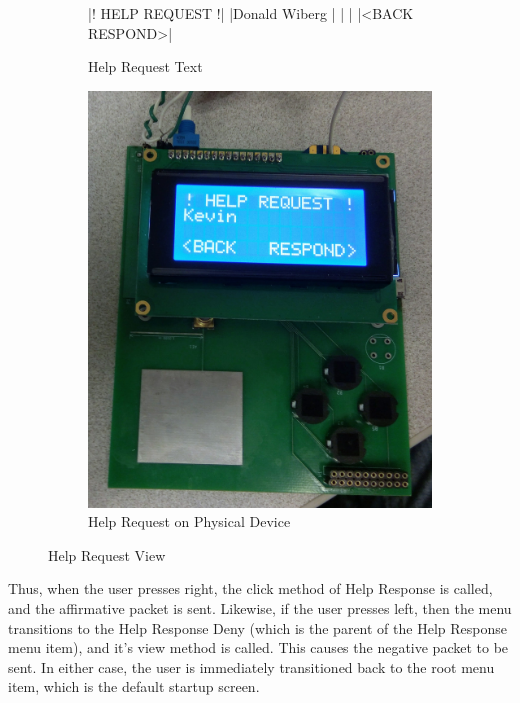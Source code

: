\documentclass[journal,compsoc]{IEEEtran}
\begin{document}
\begin{figure}
  \begin{subfigure}{0.48\textwidth}
  \centering
   |! HELP REQUEST !|
              |Donald Wiberg   |
              |                |
              |<BACK   RESPOND>|
  \caption{Help Request Text}
  \end{subfigure}
  \begin{subfigure}{0.48\textwidth}
  	\centering
  	\includegraphics[width=\textwidth]{device_help_request.jpg}
    \caption{Help Request on Physical Device}
  \end{subfigure}
  \caption{Help Request View}
  \label{menu view help}
\end{figure}

Thus, when the user presses right, the click method of Help Response is called, and the affirmative packet is sent. Likewise, if the user presses left, then the menu transitions to the Help Response Deny (which is the parent of the Help Response menu item), and it's view method is called. This causes the negative packet to be sent. In either case, the user is immediately transitioned back to the root menu item, which is the default startup screen.
\end{document}
